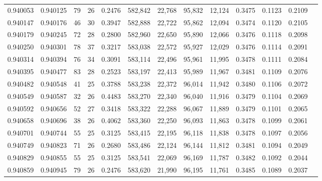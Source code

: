 \begin{tabular}{rrrrrrrrrrrrr}
0.940053 & 0.940125 &    79 &  26 &                                     0.2476 & 582,842 &  22,768 &  95,832 &  12,124 & 0.3475 & 0.1123 & 0.2109 \\
0.940147 & 0.940176 &    46 &  30 &                                     0.3947 & 582,888 &  22,722 &  95,862 &  12,094 & 0.3474 & 0.1120 & 0.2105 \\
0.940179 & 0.940245 &    72 &  28 &                                     0.2800 & 582,960 &  22,650 &  95,890 &  12,066 & 0.3476 & 0.1118 & 0.2098 \\
0.940250 & 0.940301 &    78 &  37 &                                     0.3217 & 583,038 &  22,572 &  95,927 &  12,029 & 0.3476 & 0.1114 & 0.2091 \\
0.940314 & 0.940394 &    76 &  34 &                                     0.3091 & 583,114 &  22,496 &  95,961 &  11,995 & 0.3478 & 0.1111 & 0.2084 \\
0.940395 & 0.940477 &    83 &  28 &                                     0.2523 & 583,197 &  22,413 &  95,989 &  11,967 & 0.3481 & 0.1109 & 0.2076 \\
0.940482 & 0.940548 &    41 &  25 &                                     0.3788 & 583,238 &  22,372 &  96,014 &  11,942 & 0.3480 & 0.1106 & 0.2072 \\
0.940549 & 0.940587 &    32 &  26 &                                     0.4483 & 583,270 &  22,340 &  96,040 &  11,916 & 0.3479 & 0.1104 & 0.2069 \\
0.940592 & 0.940656 &    52 &  27 &                                     0.3418 & 583,322 &  22,288 &  96,067 &  11,889 & 0.3479 & 0.1101 & 0.2065 \\
0.940658 & 0.940696 &    38 &  26 &                                     0.4062 & 583,360 &  22,250 &  96,093 &  11,863 & 0.3478 & 0.1099 & 0.2061 \\
0.940701 & 0.940744 &    55 &  25 &                                     0.3125 & 583,415 &  22,195 &  96,118 &  11,838 & 0.3478 & 0.1097 & 0.2056 \\
0.940749 & 0.940823 &    71 &  26 &                                     0.2680 & 583,486 &  22,124 &  96,144 &  11,812 & 0.3481 & 0.1094 & 0.2049 \\
0.940829 & 0.940855 &    55 &  25 &                                     0.3125 & 583,541 &  22,069 &  96,169 &  11,787 & 0.3482 & 0.1092 & 0.2044 \\
0.940859 & 0.940945 &    79 &  26 &                                     0.2476 & 583,620 &  21,990 &  96,195 &  11,761 & 0.3485 & 0.1089 & 0.2037 \\

\end{tabular}
